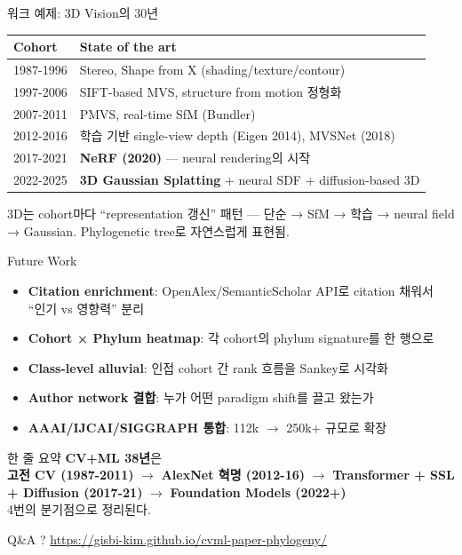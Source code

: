 \documentclass[aspectratio=169,t]{beamer}
\newcommand{\hot}[1]{\textcolor{accentorange}{\textbf{#1}}}
\newcommand{\cool}[1]{\textcolor{accentblue}{\textbf{#1}}}
\newcommand{\muted}[1]{\textcolor{mutedgray}{#1}}
\begin{document}
\begin{frame}{워크 예제: 3D Vision의 30년}
\small
\begin{tabular}{@{}ll@{}}
\toprule
\textbf{Cohort} & \textbf{State of the art} \\
\midrule
1987-1996 & Stereo, Shape from X (shading/texture/contour) \\
1997-2006 & SIFT-based MVS, structure from motion 정형화 \\
2007-2011 & PMVS, real-time SfM (Bundler) \\
2012-2016 & 학습 기반 single-view depth (Eigen 2014), MVSNet (2018) \\
2017-2021 & \cool{NeRF (2020)} — neural rendering의 시작 \\
2022-2025 & \hot{3D Gaussian Splatting} + neural SDF + diffusion-based 3D \\
\bottomrule
\end{tabular}
\vfill
\muted{3D는 cohort마다 ``representation 갱신'' 패턴 — 단순 → SfM → 학습 → neural field → Gaussian. Phylogenetic tree로 자연스럽게 표현됨.}
\end{frame}

\begin{frame}{Future Work}
\begin{itemize}
  \item \cool{Citation enrichment}: OpenAlex/SemanticScholar API로 citation 채워서 ``인기 vs 영향력'' 분리
  \item \cool{Cohort × Phylum heatmap}: 각 cohort의 phylum signature를 한 행으로
  \item \cool{Class-level alluvial}: 인접 cohort 간 rank 흐름을 Sankey로 시각화
  \item \cool{Author network 결합}: 누가 어떤 paradigm shift를 끌고 왔는가
  \item \cool{AAAI/IJCAI/SIGGRAPH 통합}: 112k $\to$ 250k+ 규모로 확장
\end{itemize}
\end{frame}

\begin{frame}{한 줄 요약}
\Large\centering
\vfill
\cool{CV+ML 38년}은 \\[6pt]
\hot{고전 CV (1987-2011)} $\to$ \hot{AlexNet 혁명 (2012-16)} $\to$ \hot{Transformer + SSL + Diffusion (2017-21)} $\to$ \hot{Foundation Models (2022+)}\\[6pt]
\muted{4번의 분기점으로 정리된다.}
\vfill
\end{frame}

\begin{frame}{Q\&A}
\Huge\centering
?
\vfill
\normalsize
\url{https://gisbi-kim.github.io/cvml-paper-phylogeny/}
\end{frame}
\end{document}
